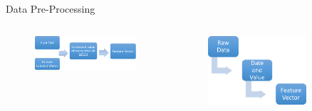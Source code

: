 \documentclass[final,hyperref={pdfpagelabels=false}]{beamer}
\begin{document}
\begin{frame}[t]
\begin{columns}[t]
\begin{column}{.445\textwidth}
\begin{block}{Data Pre-Processing}
\begin{itemize}
\begin{columns} %
\begin{column}{.4\textwidth} 
	\begin{figure}
		\includegraphics[width=1.2\linewidth]{textdata.png}
		\label{text}
	\end{figure}
\end{column}
\begin{column}{.4\textwidth} 
	\begin{figure}
		\includegraphics[width=0.8\linewidth]{numdata.png}
		\label{num}
	\end{figure}
\end{column}
\end{columns}

\end{itemize}
\end{block}


\end{column} %

\begin{column}{.02\textwidth}\end{column} %

\begin{column}{.445\textwidth} %


\end{column}
\end{columns}
\end{frame}
\end{document}
